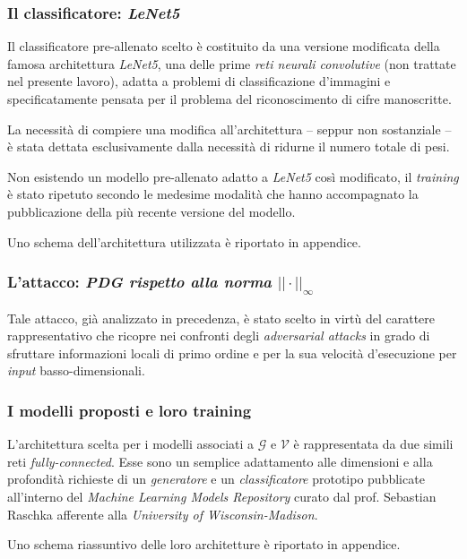 \documentclass[a4paper, twoside]{article}
\begin{document}
\subsubsection{Il classificatore: \textit{LeNet5}}

Il classificatore pre-allenato scelto è costituito da una versione modificata della famosa architettura \textit{LeNet5}, una delle prime \textit{reti neurali convolutive} (non trattate nel presente lavoro), adatta a problemi di classificazione d'immagini e specificatamente pensata per il problema del riconoscimento di cifre manoscritte.

La necessità di compiere una modifica all'architettura -- seppur non sostanziale -- è stata dettata esclusivamente dalla necessità di ridurne il numero totale di pesi.

Non esistendo un modello pre-allenato adatto a \textit{LeNet5} così modificato, il \textit{training} è stato ripetuto secondo le medesime modalità che hanno accompagnato la pubblicazione della più recente versione del modello.

Uno schema dell'architettura utilizzata è riportato in appendice.

\subsubsection{L'attacco: \textit{PDG rispetto alla norma $|| \cdot ||_{\infty}$}}

Tale attacco, già analizzato in precedenza, è stato scelto in virtù del carattere rappresentativo che ricopre nei confronti degli \textit{adversarial attacks} in grado di sfruttare informazioni locali di primo ordine e per la sua velocità d'esecuzione per \textit{input} basso-dimensionali.

\subsubsection{I modelli proposti e loro training}

L'architettura scelta per i modelli associati a $\mathcal{G}$ e $\mathcal{V}$ è rappresentata da due simili reti \textit{fully-connected}. Esse sono un semplice adattamento alle dimensioni e alla profondità richieste di un \textit{generatore} e un \textit{classificatore} prototipo pubblicate all'interno del \textit{Machine Learning Models Repository} curato dal prof. Sebastian Raschka afferente alla \textit{University of Wisconsin-Madison}.

Uno schema riassuntivo delle loro architetture è riportato in appendice.
\end{document}
